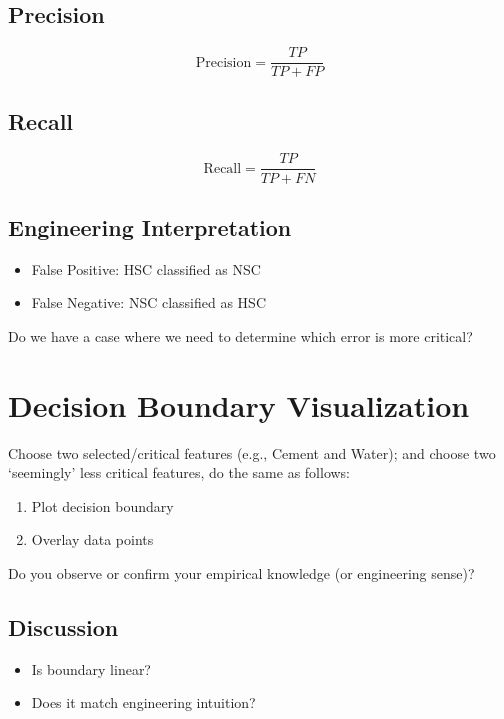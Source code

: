 \documentclass[12pt]{article}
\begin{document}
\subsection*{Precision}

\[
\text{Precision} = \frac{TP}{TP + FP}
\]

\subsection*{Recall}

\[
\text{Recall} = \frac{TP}{TP + FN}
\]

\subsection*{Engineering Interpretation}

\begin{itemize}
    \item False Positive: HSC classified as NSC
    \item False Negative: NSC classified as HSC
\end{itemize}

Do we have a case where we need to determine which error is more critical?

\section*{Decision Boundary Visualization}

Choose two selected/critical features (e.g., Cement and Water); and choose two `seemingly' less critical features, do the same as follows:

\begin{enumerate}
    \item Plot decision boundary
    \item Overlay data points
\end{enumerate}

Do you observe or confirm your empirical knowledge (or engineering sense)?

\subsection*{Discussion}

\begin{itemize}
    \item Is boundary linear?
    \item Does it match engineering intuition?
\end{itemize}
\end{document}
